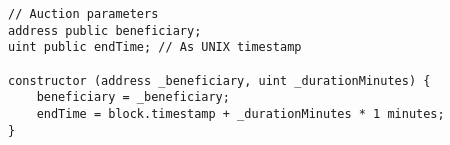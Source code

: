 \begin{lstlisting}[language=Solidity]
// Auction parameters
address public beneficiary;
uint public endTime; // As UNIX timestamp

constructor (address _beneficiary, uint _durationMinutes) {
	beneficiary = _beneficiary;
	endTime = block.timestamp + _durationMinutes * 1 minutes;
}
\end{lstlisting}